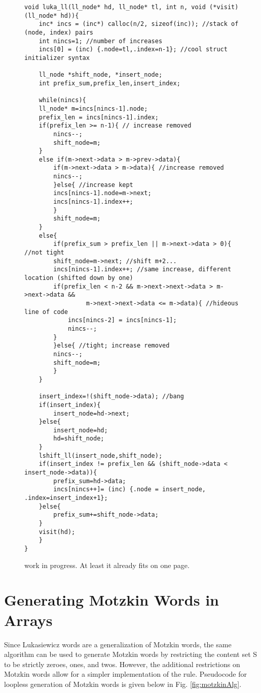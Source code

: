 


\begin{figure}[H]
\begin{Verbatim}
void luka_ll(ll_node* hd, ll_node* tl, int n, void (*visit)(ll_node* hd)){
    inc* incs = (inc*) calloc(n/2, sizeof(inc)); //stack of (node, index) pairs
    int nincs=1; //number of increases
    incs[0] = (inc) {.node=tl,.index=n-1}; //cool struct initializer syntax

    ll_node *shift_node, *insert_node;
    int prefix_sum,prefix_len,insert_index;

    while(nincs){
	ll_node* m=incs[nincs-1].node;
	prefix_len = incs[nincs-1].index;
	if(prefix_len >= n-1){ // increase removed
	    nincs--;
	    shift_node=m;
	}
	else if(m->next->data > m->prev->data){
	    if(m->next->data > m->data){ //increase removed
		nincs--;
	    }else{ //increase kept
		incs[nincs-1].node=m->next;
		incs[nincs-1].index++;
	    }
	    shift_node=m;
	}
	else{
	    if(prefix_sum > prefix_len || m->next->data > 0){ //not tight
		shift_node=m->next; //shift m+2...
		incs[nincs-1].index++; //same increase, different location (shifted down by one)
		if(prefix_len < n-2 && m->next->next->data > m->next->data && 
                 m->next->next->data <= m->data){ //hideous line of code
		    incs[nincs-2] = incs[nincs-1];
		    nincs--;
		}
	    }else{ //tight; increase removed
		nincs--;	
		shift_node=m;
	    }
	}

	insert_index=!(shift_node->data); //bang
	if(insert_index){
	    insert_node=hd->next;
	}else{
	    insert_node=hd;
	    hd=shift_node;
	}
	lshift_ll(insert_node,shift_node);
	if(insert_index != prefix_len && (shift_node->data < insert_node->data)){
	    prefix_sum=hd->data;
	    incs[nincs++]= (inc) {.node = insert_node, .index=insert_index+1};
	}else{
	    prefix_sum+=shift_node->data;
	}
	visit(hd);
    }
}
\end{Verbatim}

\caption{work in progress. At least it already fits on one page.}
\label{fig:lukaAlg}
\end{figure}


\section{Generating Motzkin Words in Arrays}
Since Lukasiewicz words are a generalization of Motzkin words, the same algorithm can be used to generate Motzkin words by restricting the content set S to be strictly zeroes, ones, and twos.  However, the additional restrictions on Motzkin words allow for a simpler implementation of the rule.   Pseudocode for loopless generation of Motzkin words is given below in Fig. \ref{fig:motzkinAlg}. 


